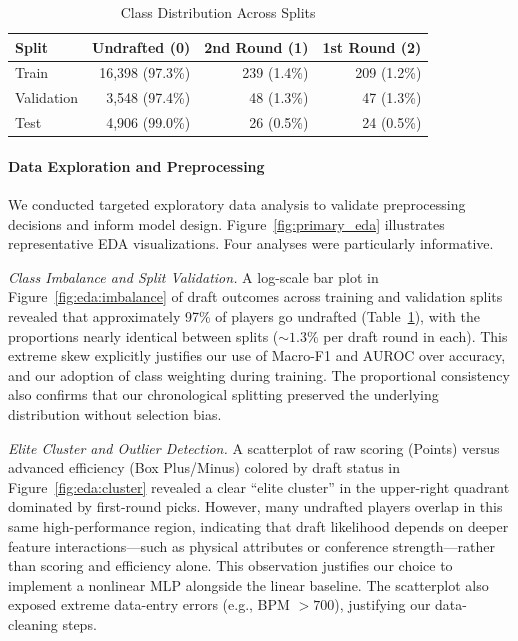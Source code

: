 \begin{table}[h]
\caption{Class Distribution Across Splits}
\label{tab:class_dist}
\centering
\begin{tabular}{|l|r|r|r|}
\hline
\textbf{Split} & \textbf{Undrafted (0)} & \textbf{2nd Round (1)} & \textbf{1st Round (2)} \\
\hline
Train & 16,398 (97.3\%) & 239 (1.4\%) & 209 (1.2\%) \\
\hline
Validation & 3,548 (97.4\%) & 48 (1.3\%) & 47 (1.3\%) \\
\hline
Test & 4,906 (99.0\%) & 26 (0.5\%) & 24 (0.5\%) \\
\hline
\end{tabular}
\end{table}

\paragraph{Data Exploration and Preprocessing}
We conducted targeted exploratory data analysis to validate preprocessing decisions and inform model design. Figure~\ref{fig:primary_eda} illustrates representative EDA visualizations. Four analyses were particularly informative.

\textit{Class Imbalance and Split Validation.} A log-scale bar plot in Figure~\ref{fig:eda:imbalance} of draft outcomes across training and validation splits revealed that approximately 97\% of players go undrafted (Table~\ref{tab:class_dist}), with the proportions nearly identical between splits (${\sim}1.3\%$ per draft round in each). This extreme skew explicitly justifies our use of Macro-F1 and AUROC over accuracy, and our adoption of class weighting during training. The proportional consistency also confirms that our chronological splitting preserved the underlying distribution without selection bias.

\textit{Elite Cluster and Outlier Detection.} A scatterplot of raw scoring (Points) versus advanced efficiency (Box Plus/Minus) colored by draft status in Figure~\ref{fig:eda:cluster} revealed a clear ``elite cluster'' in the upper-right quadrant dominated by first-round picks. However, many undrafted players overlap in this same high-performance region, indicating that draft likelihood depends on deeper feature interactions---such as physical attributes or conference strength---rather than scoring and efficiency alone. This observation justifies our choice to implement a nonlinear MLP alongside the linear baseline. The scatterplot also exposed extreme data-entry errors (e.g., BPM $> 700$), justifying our data-cleaning steps.

